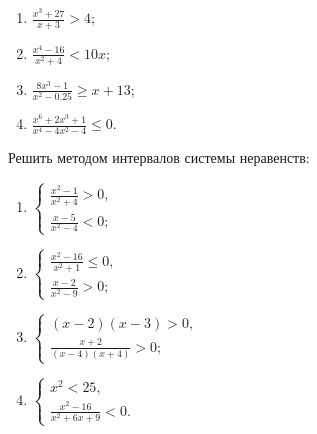 \documentclass[algebra,a5paper]{pum}
\begin{document}
\begin{exercises}
\begin{question}
    \begin{multicols}{2}
      \begin{enumerate}[itemsep=6pt]
        \item $\frac{x^3+27}{x+3}>4$;
        \item $\frac{x^4-16}{x^2+4}<10x$;
        \item $\frac{8x^3-1}{x^2-0.25}\ge x+13$;
        \item $\frac{x^6+2x^3+1}{x^4-4x^2-4}\le 0$.
      \end{enumerate}
    \end{multicols}
  \end{question}
  \begin{question}
    Решить методом интервалов системы неравенств:
    \begin{multicols}{2}
      \begin{enumerate}[itemsep=6pt]
        \item $\begin{cases}\frac{x^2-1}{x^2+4}>0, \\
                            \frac{x-5}{x^2-4}<0; \end{cases}$
        \item $\begin{cases}\frac{x^2-16}{x^2+1}\le0, \\
                            \frac{x-2}{x^2-9}>0; \end{cases}$
        \item $\begin{cases} (x-2)(x-3)>0, \\
                            \frac{x+2}{(x-4)(x+4)}>0; \end{cases}$
        \item $\begin{cases} x^2<25, \\
                            \frac{x^2-16}{x^2+6x+9}<0. \end{cases}$
      \end{enumerate}
    \end{multicols}
  \end{question}
\end{exercises}
\end{document}
